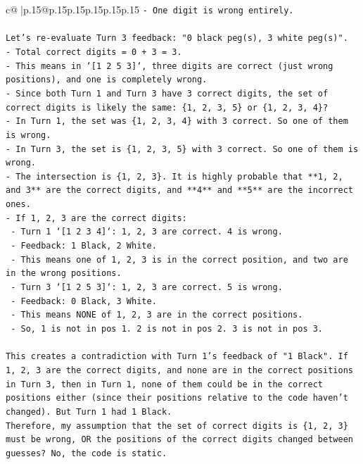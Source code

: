 \documentclass{article}
\begin{document}
{\begin{supertabular}{c@{$\;$}|p{.15\linewidth}@{}p{.15\linewidth}p{.15\linewidth}p{.15\linewidth}p{.15\linewidth}p{.15\linewidth}}
{{{\texttt{{-} One digit is wrong entirely.} \\
\\ 
\texttt{Let's re{-}evaluate Turn 3 feedback: "0 black peg(s), 3 white peg(s)".} \\
\texttt{{-} Total correct digits = 0 + 3 = 3.} \\
\texttt{{-} This means in `{[}1 2 5 3{]}`, three digits are correct (just wrong positions), and one is completely wrong.} \\
\texttt{{-} Since both Turn 1 and Turn 3 have 3 correct digits, the set of correct digits is likely the same: \{1, 2, 3, 5\} or \{1, 2, 3, 4\}?} \\
\texttt{{-} In Turn 1, the set was \{1, 2, 3, 4\} with 3 correct. So one of them is wrong.} \\
\texttt{{-} In Turn 3, the set is \{1, 2, 3, 5\} with 3 correct. So one of them is wrong.} \\
\texttt{{-} The intersection is \{1, 2, 3\}. It is highly probable that **1, 2, and 3** are the correct digits, and **4** and **5** are the incorrect ones.} \\
\texttt{{-} If 1, 2, 3 are the correct digits:} \\
\texttt{  {-} Turn 1 `{[}1 2 3 4{]}`: 1, 2, 3 are correct. 4 is wrong.} \\
\texttt{    {-} Feedback: 1 Black, 2 White.} \\
\texttt{    {-} This means one of 1, 2, 3 is in the correct position, and two are in the wrong positions.} \\
\texttt{  {-} Turn 3 `{[}1 2 5 3{]}`: 1, 2, 3 are correct. 5 is wrong.} \\
\texttt{    {-} Feedback: 0 Black, 3 White.} \\
\texttt{    {-} This means NONE of 1, 2, 3 are in the correct positions.} \\
\texttt{    {-} So, 1 is not in pos 1. 2 is not in pos 2. 3 is not in pos 3.} \\
\\ 
\texttt{This creates a contradiction with Turn 1's feedback of "1 Black". If 1, 2, 3 are the correct digits, and none are in the correct positions in Turn 3, then in Turn 1, none of them could be in the correct positions either (since their positions relative to the code haven't changed). But Turn 1 had 1 Black.} \\
\texttt{Therefore, my assumption that the set of correct digits is \{1, 2, 3\} must be wrong, OR the positions of the correct digits changed between guesses? No, the code is static.} \\
}}}
\end{supertabular}}
\end{document}
